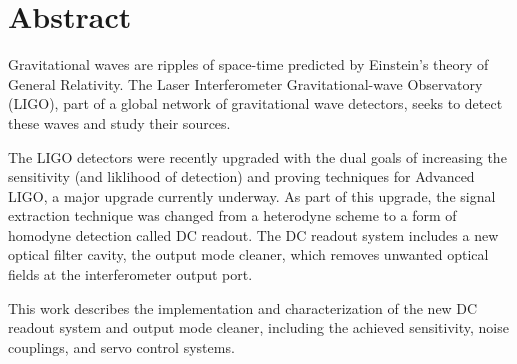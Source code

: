 \chapter*{Abstract}
Gravitational waves are ripples of space-time predicted by Einstein's
theory of General Relativity.  The Laser Interferometer
Gravitational-wave Observatory (LIGO), part of a global network of
gravitational wave detectors, seeks to detect these waves and study
their sources.

The LIGO detectors were recently upgraded with the dual goals of
increasing the sensitivity (and liklihood of detection) and proving
techniques for Advanced LIGO, a major upgrade currently underway.  As
part of this upgrade, the signal extraction technique was changed from
a heterodyne scheme to a form of homodyne detection called DC readout.
The DC readout system includes a new optical filter cavity, the output
mode cleaner, which removes unwanted optical fields at the
interferometer output port.

This work describes the implementation and characterization of the new
DC readout system and output mode cleaner, including the achieved
sensitivity, noise couplings, and servo control systems.

